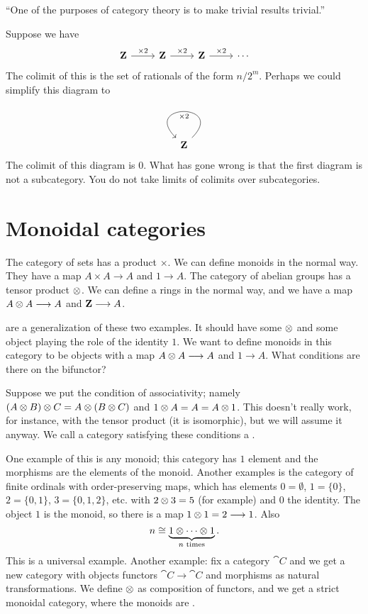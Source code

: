 \documentclass[11pt, oneside]{article}
\begin{document}
``One of the purposes of category theory is to make trivial results trivial.''

Suppose we have
$$
\begin{tikzcd}
\Z \arrow[r, "\times 2"] & \Z\arrow[r, "\times 2"]& \Z\arrow[r, "\times 2"] & \cdots
\end{tikzcd}
$$
The colimit of this is the set of rationals of the form $n/2^m$. Perhaps we could simplify this diagram to 
$$
\begin{tikzcd}
\Z \arrow[loop, "\times 2"] 
\end{tikzcd}
$$
The colimit of this diagram is $0$. What has gone wrong is that the first diagram is not a subcategory. You do not take limits of colimits over subcategories. 

\section{Monoidal categories}
The category of sets has a product $\times$. We can define monoids in the normal way. They have a map $A\times A \longrightarrow A$ and $1\longrightarrow A$. The category of abelian groups has a tensor product $\otimes$. We can define a rings in the normal way, and we have a map $A\otimes A \longrightarrow A$ and $\mathbf Z \longrightarrow A$. 

\href{https://en.wikipedia.org/wiki/Monoidal_category}{} are a generalization of these two examples. It should have some \href{https://en.wikipedia.org/wiki/Functor#Bifunctors_and_multifunctors}{} $\otimes$ and some object playing the role of the identity $1$. We want to define monoids in this category to be objects with a map $A\otimes A\longrightarrow A$ and $1\longrightarrow A$. What conditions are there on the bifunctor?

Suppose we put the condition of associativity; namely $(A\otimes B)\otimes C = A \otimes (B\otimes C)$ and $1\otimes A = A = A\otimes 1$. This doesn't really work, for instance, with the tensor product (it is isomorphic), but we will assume it anyway. We call a category satisfying these conditions a \href{https://en.wikipedia.org/wiki/Monoidal_category}{}.

One example of this is any monoid; this category has $1$ element and the morphisms are the elements of the monoid. Another examples is the category of finite ordinals with order-preserving maps, which has elements $0=\emptyset$, $1 = \{0\}$, $2 = \{0,1\}$, $3 = \{0,1,2\}$, etc. with $2\otimes 3 = 5$ (for example) and $0$ the identity. The object $1$ is the monoid, so there is a map $1\otimes 1 = 2\longrightarrow 1$. Also
$$
n \cong \underbrace{1 \otimes \cdots \otimes 1 }_{n \textrm{ times}}.
$$
This is a universal example. Another example: fix a category $\cat C$ and we get a new category with objects functors $\cat C\longrightarrow\cat C$ and morphisms as natural transformations. We define $\otimes$ as composition of functors, and we get a strict monoidal category, where the monoids are \href{https://en.wikipedia.org/wiki/Monad_(category_theory)}{}.
\end{document}
